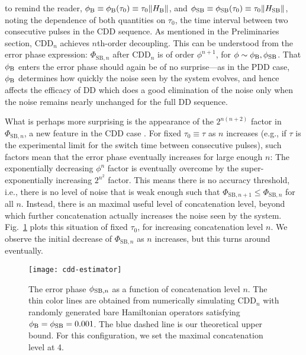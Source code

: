 \documentclass[pra,reprint,superscriptaddress]{revtex4-2}
\newcommand{\HB}{H_\mathrm{B}}
\newcommand{\HSB}{H_\mathrm{SB}}
\newcommand{\CDDn}{\mathrm{CDD}_n}
\begin{document}
to remind the reader, $\phi_\rB\equiv\phi_\rB(\tau_0)\equiv\tau_0\Vert \HB\Vert$, and $\phi_\rSB\equiv\phi_\rSB(\tau_0)\equiv\tau_0\Vert\HSB\Vert$, noting the dependence of both quantities on $\tau_0$, the time interval between two consecutive pulses in the CDD sequence.  As mentioned in the Preliminaries section, $\CDDn$ achieves $n$th-order decoupling. This can be understood from the error phase expression: $\Phi_{\mathrm{SB},n}$ after $\CDDn$ is of order $\phi^{n+1}$, for $\phi\sim\phi_{\mathrm{B}}, \phi_{\mathrm{SB}}$. That $\phi_{\mathrm{B}}$ enters the error phase should again be of no surprise---as in the PDD case, $\phi_{\mathrm{B}}$ determines how quickly the noise seen by the system evolves, and hence affects the efficacy of DD which does a good elimination of the noise only when the noise remains nearly unchanged for the full DD sequence. 

What is perhaps more surprising is the appearance of the $2^{n(n+2)}$ factor in $\Phi_{\mathrm{SB},n}$, a new feature in the CDD case . For fixed $\tau_0\equiv \tau$ as $n$ increases (e.g., if $\tau$ is the experimental limit for the switch time between consecutive pulses), such factors mean that the error phase eventually increases for large enough $n$: The exponentially decreasing $\phi^n$ factor is eventually overcome by the super-exponentially increasing $2^{n^2}$ factor. This means there is no accuracy threshold, i.e., there is no level of noise that is weak enough such that $\Phi_{\mathrm{SB},n+1}\leq\Phi_{\mathrm{SB},n}$ for all $n$. Instead, there is an maximal useful level of concatenation level, beyond which further concatenation actually increases the noise seen by the system. Fig.~\ref{fig:estimator-size} plots this situation of fixed $\tau_0$, for increasing concatenation level $n$. We observe the initial decrease of $\Phi_{\mathrm{SB},n}$ as $n$ increases, but this turns around eventually. 

\begin{figure}
    \texttt{[image: cdd-estimator]}
    \caption{The error phase $\phi_{\mathrm{SB},n}$ as a function of concatenation level $n$. 
    The thin color lines are obtained from numerically simulating $\CDDn$ with randomly generated bare Hamiltonian operators satisfying $\phi_{\mathrm{B}}=\phi_{\mathrm{SB}}=0.001$. The blue dashed line is our theoretical upper bound. For this configuration, we set the maximal concatenation level at 4.}
    \label{fig:estimator-size}
\end{figure}
\end{document}
